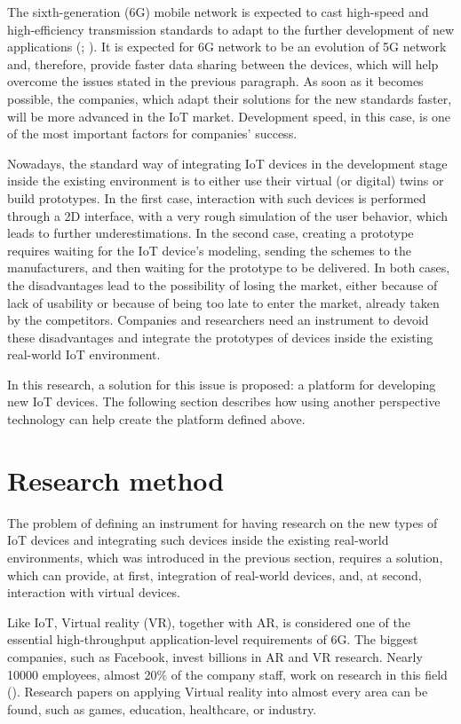 The sixth-generation (6G) mobile network is expected to cast high-speed and high-efficiency transmission standards to adapt to the further development of new applications (\cite{liao_information-centric_2021}; \cite{huang_survey_2019}). It is expected for 6G network to be an evolution of 5G network and, therefore, provide faster data sharing between the devices, which will help overcome the issues stated in the previous paragraph. As soon as it becomes possible, the companies, which adapt their solutions for the new standards faster, will be more advanced in the IoT market. Development speed, in this case, is one of the most important factors for companies' success.

Nowadays, the standard way of integrating IoT devices in the development stage inside the existing environment is to either use their virtual (or digital) twins or build prototypes. In the first case, interaction with such devices is performed through a 2D interface, with a very rough simulation of the user behavior, which leads to further underestimations. In the second case, creating a prototype requires waiting for the IoT device's modeling, sending the schemes to the manufacturers, and then waiting for the prototype to be delivered. In both cases, the disadvantages lead to the possibility of losing the market, either because of lack of usability or because of being too late to enter the market, already taken by the competitors. Companies and researchers need an instrument to devoid these disadvantages and integrate the prototypes of devices inside the existing real-world IoT environment.

In this research, a solution for this issue is proposed: a platform for developing new IoT devices. The following section describes how using another perspective technology can help create the platform defined above.

\section{Research method}

The problem of defining an instrument for having research on the new types of IoT devices and integrating such devices inside the existing real-world environments, which was introduced in the previous section, requires a solution, which can provide, at first, integration of real-world devices, and, at second, interaction with virtual devices.

Like IoT, Virtual reality (VR), together with AR, is considered one of the essential high-throughput application-level requirements of 6G. The biggest companies, such as Facebook, invest billions in AR and VR research. Nearly 10000 employees, almost 20\% of the company staff, work on research in this field (\cite{sam_byford_almost_2021}). Research papers on applying Virtual reality into almost every area can be found, such as games, education, healthcare, or industry.

